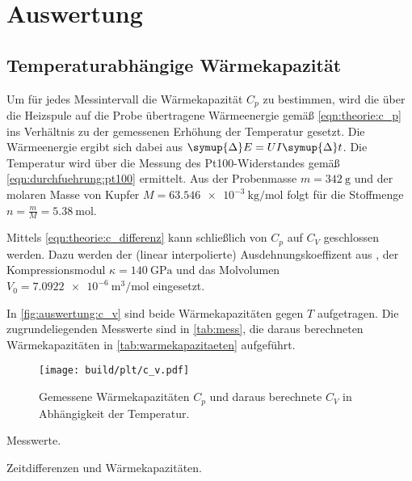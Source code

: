 \section{Auswertung}
\label{sec:auswertung}

\subsection{Temperaturabhängige Wärmekapazität}
Um für jedes Messintervall die Wärmekapazität $C_p$ zu bestimmen,
wird die über die Heizspule auf die Probe übertragene Wärmeenergie
gemäß \autoref{eqn:theorie:c_p} %
ins Verhältnis zu der gemessenen Erhöhung der Temperatur gesetzt.
Die Wärmeenergie ergibt sich dabei aus $\symup{\Delta}E = U I \symup{\Delta}t$.
Die Temperatur wird über die Messung des Pt100-Widerstandes gemäß \autoref{eqn:durchfuehrung:pt100} ermittelt.
Aus der Probenmasse $m = \SI{342}{\gram}$ \cite{versuchsanleitung}
und der molaren Masse von Kupfer $M = \SI{63.546e-3}{\kilogram\per\mol}$ \cite{periodictable}
folgt für die Stoffmenge $n = \frac{m}{M} = \SI{5.38}{\mol}$.

Mittels \autoref{eqn:theorie:c_differenz} kann schließlich von $C_p$ auf $C_V$ geschlossen werden.
Dazu werden
der (linear interpolierte) Ausdehnungskoeffizent aus \cite[Tabelle 2]{versuchsanleitung},
der Kompressionsmodul $\kappa = \SI{140}{\giga\pascal}$ \cite{periodictable} und
das Molvolumen $V_0 = \SI{7.0922e-6}{\cubic\meter\per\mol}$ eingesetzt.

In \autoref{fig:auswertung:c_v} sind beide Wärmekapazitäten gegen $T$ aufgetragen.
Die zugrundeliegenden Messwerte sind in \autoref{tab:mess},
die daraus berechneten Wärmekapazitäten in \autoref{tab:warmekapazitaeten} aufgeführt.

\begin{figure}[H]
    \centering
    \texttt{[image: build/plt/c\_v.pdf]}
    \caption{Gemessene Wärmekapazitäten $C_p$ und daraus berechnete $C_V$ in Abhängigkeit der Temperatur.}
    \label{fig:auswertung:c_v}
\end{figure}

\begin{table}
    \centering
    \caption{Messwerte.}
    \label{tab:mess}
\end{table}

\begin{table}
    \centering
    \caption{Zeitdifferenzen und Wärmekapazitäten.}
    \label{tab:warmekapazitaeten}
\end{table}


